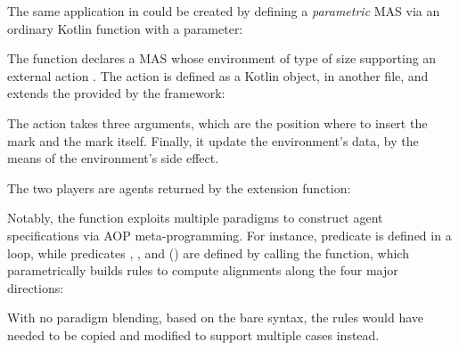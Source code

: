 The same application in \jakta{} could be created by defining a
\emph{parametric} \ac{MAS} via an ordinary Kotlin function with a parameter:
\\
\begin{minipage}[c]{\textwidth}
\end{minipage}
%
The function declares a \ac{MAS} whose environment of type 
of size  supporting an external action .
%
The  action is defined as a Kotlin object, in another file,
and extends the  provided by the framework:
\\
\begin{minipage}[c]{\textwidth}
\end{minipage}
%
The action takes three arguments, which are the position where to insert the mark and the mark itself.
%
Finally, it update the environment's data, by the means of the  environment's side effect.

The two players are agents returned by the  extension function:
%
\\
\begin{minipage}[c]{\textwidth}
\end{minipage}
%
Notably, the function exploits multiple paradigms to construct agent specifications via AOP meta-programming.
%
For instance,
predicate  is defined in a  loop,
while predicates , , and () are defined
by calling the  function,
which parametrically builds rules to compute alignments along the four major directions:
\\
\begin{minipage}[c]{\textwidth}
\end{minipage}
%
With no paradigm blending,
based on the bare \agentspeak{} syntax,
the rules would have needed to be copied and modified to support multiple cases instead.

